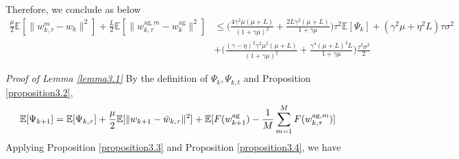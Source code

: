 \documentclass[11pt]{article}
\begin{document}
Therefore, we conclude as below
\begin{align*}
    \frac{\mu}{2}\mathbb{E}[\|w_{k, \tau}^m - w_k\|^2] + \frac{L}{2} \mathbb{E}[\|w_{k, \tau}^{\textrm{ag}, m} - w_k^{\textrm{ag}}\|^2] &\leq \Big( \frac{4\gamma^2\mu(\mu+L)}{(1+\gamma\mu)^2} + \frac{2L\gamma^2(\mu+L)}{1+\gamma\mu}\Big)\tau^2 \mathbb{E}[\Psi_k] + (\gamma^2\mu+\eta^2 L)\tau\sigma^2 \\
    &+ \Big( \frac{(\gamma-\eta)^2\gamma^2\mu^2(\mu+L)}{(1+\gamma\mu)^2} + \frac{\gamma^4(\mu+L)^2 L}{1+\gamma\mu} \Big) \frac{\tau^3\sigma^2}{2}
\end{align*}

\emph{Proof of Lemma \ref{lemma3.1}} \textrm{ } By the definition of $\Psi_k, \Psi_{k, t}$ and Proposition \ref{proposition3.2},
\begin{gather*}
    \mathbb{E}[\Psi_{k+1}] = \mathbb{E}[\Psi_{k, \tau}] + \frac{\mu}{2}\mathbb{E}[\|w_{k+1} - \Bar{w}_{k, \tau}\|^2] + \mathbb{E}[F(w_{k+1}^{\textrm{ag}}) - \frac{1}{M} \sum_{m=1}^M F(w_{k, \tau}^{\textrm{ag}, m})]
\end{gather*}
Applying Proposition \ref{proposition3.3} and Proposition \ref{proposition3.4}, we have
\end{document}
